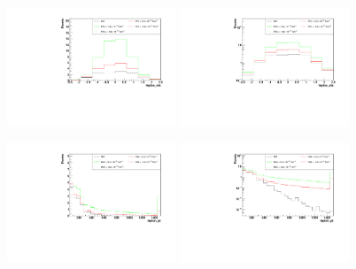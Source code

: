 \begin{figure}[h]
  \begin{center}
	\includegraphics[width=0.45\textwidth]{Plots/aQGC_kinematics/lepton_eta_FT2.pdf}%
	\includegraphics[width=0.45\textwidth]{Plots/aQGC_kinematics/lepton_eta_FT2_log.pdf}\\				
    \caption{}
  \end{center}
\end{figure}

\begin{figure}[h]
  \begin{center}
	\includegraphics[width=0.45\textwidth]{Plots/aQGC_kinematics/lepton_pt_FM0.pdf}%
	\includegraphics[width=0.45\textwidth]{Plots/aQGC_kinematics/lepton_pt_FM0_log.pdf}\\				
    \caption{}
  \end{center}
\end{figure}

